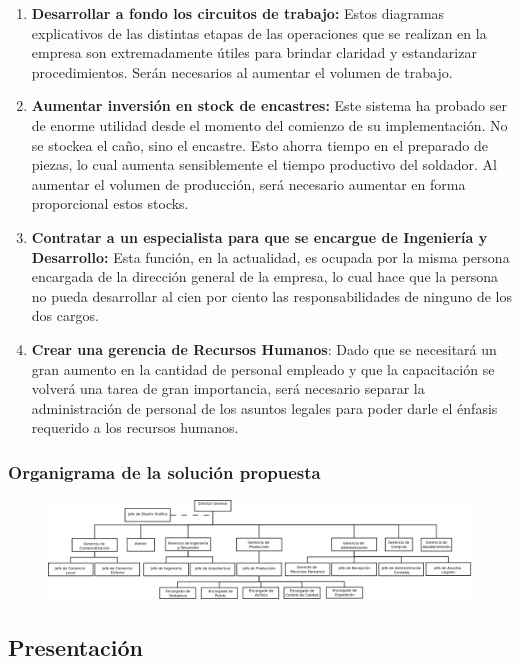 \documentclass[a4paper,10pt,titlepage]{article}
\begin{document}
\begin{enumerate}
\item \textbf{Desarrollar a fondo los circuitos de trabajo:} Estos diagramas explicativos de las distintas etapas de las operaciones que se realizan en la empresa son extremadamente \'utiles para brindar claridad y estandarizar procedimientos. Ser\'an necesarios al aumentar el volumen de trabajo.

\item \textbf{Aumentar inversi\'on en stock de encastres:} Este sistema ha probado ser de enorme utilidad desde el momento del comienzo de su implementaci\'on. No se stockea el ca\~no, sino el encastre. Esto ahorra tiempo en el preparado de piezas, lo cual aumenta sensiblemente el tiempo productivo del soldador. Al aumentar el volumen de producci\'on, ser\'a necesario aumentar en forma proporcional estos stocks.

\item \textbf{Contratar a un especialista para que se encargue de Ingenier\'ia y Desarrollo:} Esta funci\'on, en la actualidad, es ocupada por la misma persona encargada de la direcci\'on general de la empresa, lo cual hace que la persona no pueda desarrollar al cien por ciento las responsabilidades de ninguno de los dos cargos.

\item \textbf{Crear una gerencia de Recursos Humanos}: Dado que se necesitar\'a un gran aumento en la cantidad de personal empleado y que la capacitaci\'on se volver\'a una tarea de gran importancia, ser\'a necesario separar la administraci\'on de personal de los asuntos legales para poder darle el \'enfasis requerido a los recursos humanos.

\end{enumerate}

\subsubsection{Organigrama de la soluci\'on propuesta}
\begin{figure}[H]
\centering
\includegraphics[angle=90,scale=0.3]{./Organigramas/OrganiHipotesis.png}
\end{figure}

\newpage
\vspace*{\fill}
\begin{center}
\begingroup
\titlerule
\vspace{1cm}
\section{Presentaci\'on}
\vspace{1cm}
\titlerule
\endgroup
\end{center}
\vspace*{\fill}
\end{document}
